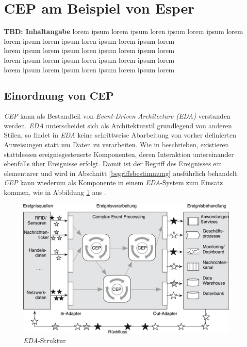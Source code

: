 \documentclass{acm_proc_article-sp}
\begin{document}
%
%

\section{CEP am Beispiel von Esper}
\vspace{0.1cm}
\textbf{TBD: Inhaltangabe}
lorem ipsum lorem ipsum loren ipsum lorem ipsum lorem \\
lorem ipsum lorem ipsum loren ipsum lorem ipsum lorem \\
lorem ipsum lorem ipsum loren ipsum lorem ipsum lorem \\
lorem ipsum lorem ipsum loren ipsum lorem ipsum lorem \\
lorem ipsum lorem ipsum loren ipsum lorem ipsum lorem \\

\subsection{Einordnung von CEP}
\vspace{0.1cm}
\textit{CEP} kann als Bestandteil von \textit{Event-Driven Architecture (EDA)} verstanden 
werden. \textit{EDA} unterscheidet sich als Architekturstil 
grundlegend von anderen Stilen, so findet in \textit{EDA} keine schrittweise Abarbeitung 
von vorher definierten Anweisungen statt um Daten zu verarbeiten. Wie in \cite{glossary} 
beschrieben, existieren stattdessen ereignisgesteuerte Komponenten, deren Interaktion 
untereinander ebenfalls über Ereignisse erfolgt. Damit ist der Begriff des Ereignisses 
ein elementarer und wird in Abschnitt \ref{begriffsbestimmung} ausführlich behandelt. 
\textit{CEP} kann wiederum als Komponente in einem \textit{EDA}-System zum Einsatz 
kommen, wie in Abbildung \ref{img:eda-struktur} aus \cite{bruns}.

\begin{figure}[H]
    \centering
    \includegraphics[width=\linewidth]{img/eda-struktur-bruns.jpg}
    \caption{\textit{EDA}-Struktur}
    \label{img:eda-struktur}
\end{figure}
\end{document}
